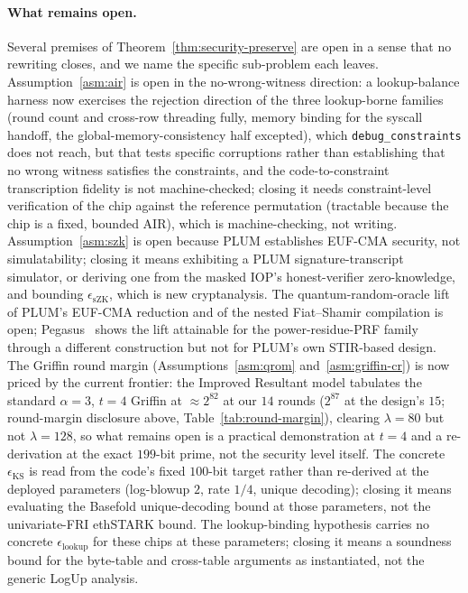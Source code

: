 \paragraph{What remains open.}
Several premises of Theorem~\ref{thm:security-preserve} are open in a sense that no rewriting closes, and we name the specific sub-problem each leaves. Assumption~\ref{asm:air} is open in the no-wrong-witness direction: a lookup-balance harness now exercises the rejection direction of the three lookup-borne families (round count and cross-row threading fully, memory binding for the syscall handoff, the global-memory-consistency half excepted), which \texttt{debug\_constraints} does not reach, but that tests specific corruptions rather than establishing that no wrong witness satisfies the constraints, and the code-to-constraint transcription fidelity is not machine-checked; closing it needs constraint-level verification of the chip against the reference permutation (tractable because the chip is a fixed, bounded AIR), which is machine-checking, not writing. Assumption~\ref{asm:szk} is open because PLUM establishes EUF-CMA security, not simulatability; closing it means exhibiting a PLUM signature-transcript simulator, or deriving one from the masked IOP's honest-verifier zero-knowledge, and bounding $\epsilon_{\mathrm{sZK}}$, which is new cryptanalysis. The quantum-random-oracle lift of PLUM's EUF-CMA reduction and of the nested Fiat--Shamir compilation is open; Pegasus~\cite{cryptoeprint:2025/1841} shows the lift attainable for the power-residue-PRF family through a different construction but not for PLUM's own STIR-based design. The Griffin round margin (Assumptions~\ref{asm:qrom} and~\ref{asm:griffin-cr}) is now priced by the current frontier: the Improved Resultant model tabulates the standard $\alpha=3$, $t=4$ Griffin at $\approx 2^{82}$ at our $14$ rounds ($2^{87}$ at the design's $15$; round-margin disclosure above, Table~\ref{tab:round-margin}), clearing $\lambda=80$ but not $\lambda=128$, so what remains open is a practical demonstration at $t=4$ and a re-derivation at the exact $199$-bit prime, not the security level itself. The concrete $\epsilon_{\mathrm{KS}}$ is read from the code's fixed $100$-bit target rather than re-derived at the deployed parameters (log-blowup $2$, rate $1/4$, unique decoding); closing it means evaluating the Basefold unique-decoding bound at those parameters, not the univariate-FRI ethSTARK bound. The lookup-binding hypothesis carries no concrete $\epsilon_{\mathrm{lookup}}$ for these chips at these parameters; closing it means a soundness bound for the byte-table and cross-table arguments as instantiated, not the generic LogUp analysis. 

